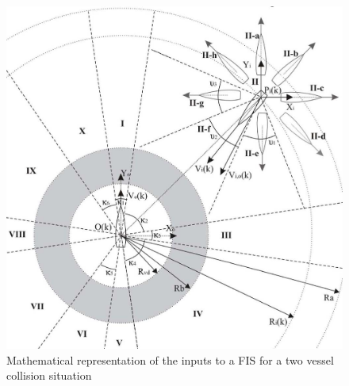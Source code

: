 \begin{figure}[H]
    \centering
    \includegraphics[width=\linewidth]{Figures/model}
    \caption{Mathematical representation of the inputs to a FIS for a two vessel collision situation\cite{perera2012intelligent}}
    \label{fig:model}
\end{figure}

